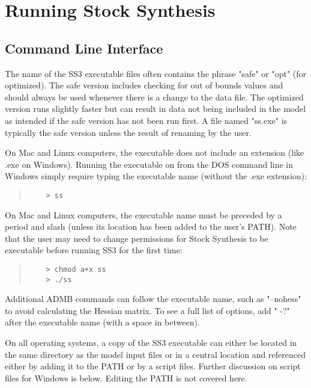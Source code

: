 \section{Running Stock Synthesis} \label{sec:RunningSS}

\subsection{Command Line Interface}
The name of the SS3 executable files often contains the phrase "safe" or "opt" (for optimized). The safe version includes checking for out of bounds values and should always be used whenever there is a change to the data file. The optimized version runs slightly faster but can result in data not being included in the model as intended if the safe version has not been run first. A file named "ss.exe" is typically the safe version unless the result of renaming by the user.

On Mac and Linux computers, the executable does not include an extension (like .exe on Windows).
Running the executable on from the DOS command line in Windows simply require typing the executable name (without the .exe extension):
\begin{quote}
	\begin{verbatim}
	> ss
	\end{verbatim}
\end{quote}


On Mac and Linux computers, the executable name must be preceded by a period and slash (unless its location has been added to the user's PATH). Note that the user may need to change permissions for Stock Synthesis to be executable before running SS3 for the first time:

\begin{quote}
	\begin{verbatim}
	> chmod a+x ss
	> ./ss
	\end{verbatim}
\end{quote}

Additional ADMB commands can follow the executable name, such as "–nohess" to avoid calculating the Hessian matrix. To see a full list of options, add " -?" after the executable name (with a space in between).

On all operating systems, a copy of the SS3 executable can either be located in the same directory as the model input files or in a central location and referenced either by adding it to the PATH or by a script files. Further discussion on script files for Windows is below. Editing the PATH is not covered here.

